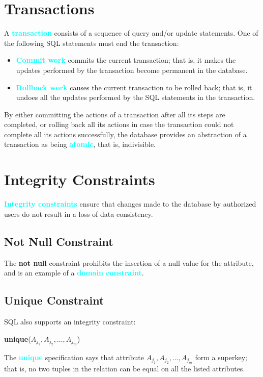 \documentclass[a4paper,12pt,twoside,openany]{book}
\newcommand{\textcy}[1]{\textbf{\textcolor{cyan}{#1}}}
\begin{document}
\section{Transactions}

A \textcy{transaction} consists of a sequence of query and/or update statements. One of the following SQL statements must end the transaction:
\begin{itemize}
    \item \textcy{Commit work} commits the current transaction; that is, it makes the updates performed by the transaction become permanent in the database.
    \item \textcy{Rollback work} causes the current transaction to be rolled back; that is, it undoes all the updates performed by the SQL statements in the transaction.
\end{itemize}

By either committing the actions of a transaction after all its steps are completed, or rolling back all its actions in case the transaction could not complete all its actions successfully, the database provides an abstraction of a transaction as being \textcy{atomic}, that is, indivisible.

\section{Integrity Constraints}

\textcy{Integrity constraints} ensure that changes made to the database by authorized users do not result in a loss of data consistency.

\subsection{Not Null Constraint}

The \textbf{not null} constraint prohibits the insertion of a null value for the attribute, and is an example of a \textcy{domain constraint}.

\subsection{Unique Constraint}

SQL also supports an integrity constraint:
\begin{center}
    \textbf{unique}($A_{j_1},A_{j_2},\ldots,A_{j_m}$)
\end{center}
The \textcy{unique} specification says that attribute $A_{j_1},A_{j_2},\ldots,A_{j_m}$ form a superkey; that is, no two tuples in the relation can be equal on all the listed attributes.
\end{document}
